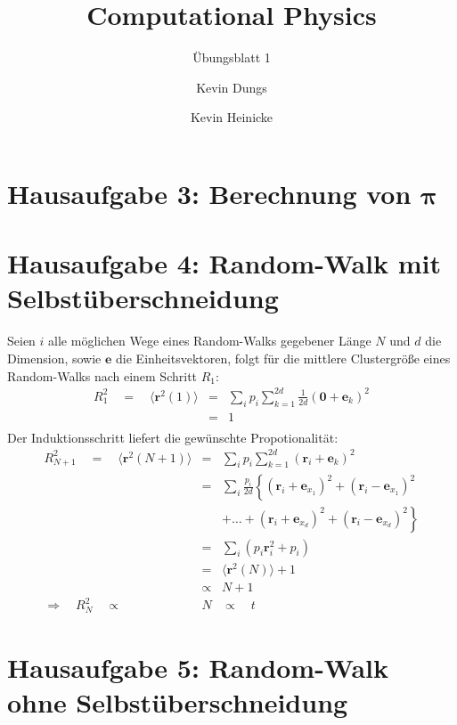 \documentclass{scrartcl}
\author{Kevin Dungs \and Kevin Heinicke}
\title{Computational Physics}
\subtitle{Übungsblatt 1}
\renewcommand{\vec}[1]{\mathbf{#1}}
\begin{document}
\maketitle

\section*{Hausaufgabe 3: Berechnung von $\mathbf{\pi}$} 

\section*{Hausaufgabe 4: Random-Walk mit Selbstüberschneidung}
Seien $i$ alle möglichen Wege eines Random-Walks gegebener Länge $N$ und $d$ die Dimension, sowie $\vec{e}$ die Einheitsvektoren, folgt für die mittlere Clustergröße eines Random-Walks nach einem Schritt $R_1$:
    \begin{eqnarray*}
        R_1^2 \quad = \quad \langle \vec{r}^2(1) \rangle & = & \sum_i p_i \sum_{k=1}^{2d} \frac{1}{2d}\left(\vec{0} + \vec{e}_k \right)^2 \\
        & = & 1 \\
    \end{eqnarray*}
Der Induktionsschritt liefert die gewünschte Propotionalität:
    \begin{eqnarray*}
        R_{N+1}^2 \quad = \quad \langle \vec{r}^2(N+1) \rangle & = & \sum_i p_i \sum_{k=1}^{2d} \left( \vec{r}_i + \vec{e}_k \right)^2 \\
                                                               & = & \sum_i \frac{p_i}{2d} \left\{ \left( \vec{r}_i + \vec{e}_{x_1} \right)^2 + \left( \vec{r}_i - \vec{e}_{x_1} \right)^2 \right. \\ 
                                                               & & \left. + \dots + \left( \vec{r}_i + \vec{e}_{x_d} \right)^2 + \left( \vec{r}_i - \vec{e}_{x_d} \right)^2 \right\} \\
                                                               & = & \sum_i \left( p_i \vec{r}_i^2 + p_i \right) \\
                                                               & = & \langle \vec{r}^2(N) \rangle + 1 \\
                                                               & \propto & N + 1 \\
        \Rightarrow \quad R_N^2 \quad \propto & N & \propto \quad t
    \end{eqnarray*}


\section*{Hausaufgabe 5: Random-Walk ohne Selbstüberschneidung}
\end{document}
